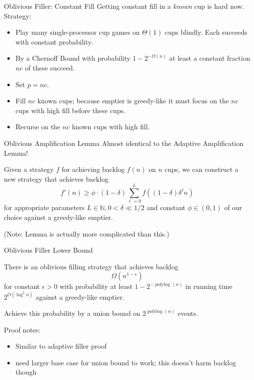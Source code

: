 \documentclass[xcolor=x11names, svgnames, rgb]{beamer}
\newcommand{\polylog}{\operatorname{polylog}}
\begin{document}
\begin{frame}[t]{Oblivious Filler: Constant Fill}
  Getting constant fill in a \emph{known} cup is hard now. Strategy:
  \begin{itemize}
    \item Play many single-processor cup games on $\Theta(1)$ cups
      blindly. Each succeeds with constant probability.
    \item By a Chernoff Bound with probability $1-2^{-\Omega(n)}$ at least a constant fraction $nc$ of these succeed.
    \item Set $p=nc$.
    \item Fill $nc$ known cups; because emptier is greedy-like it must focus on the $nc$ cups with high fill before these cups.
    \item Recurse on the $nc$ known cups with high fill.
  \end{itemize}
\end{frame}

\begin{frame}[t]{Oblivious Amplification Lemma}
Almost identical to the Adaptive Amplification Lemma!
  \begin{lemma}
    Given a strategy $f$ for achieving backlog $f(n)$ on $n$ cups, we can construct a new strategy that achieves backlog 
    $$f'(n) \ge \phi \cdot (1-\delta)\sum_{\ell=0}^L f((1-\delta)\delta^\ell n)$$
    for appropriate parameters $L\in\mathbb{N}, 0<\delta\ll 1/2$ and constant $\phi \in (0,1)$ of our choice against a greedy-like emptier.
  \end{lemma}

  (Note: Lemma is actually more complicated than this.)
\end{frame}

\begin{frame}[t]{Oblivious Filler Lower Bound }
  \begin{theorem}
    There is an oblivious filling strategy that achieves backlog
    $$\Omega(n^{1-\epsilon})$$ for constant $\epsilon > 0$ with probability at
    least $1-2^{-\polylog(n)}$ in running time $2^{O(\log^2 n)}$ against a greedy-like emptier.
  \end{theorem}

  Achieve this probability by a union bound on $2^{\polylog(n)}$ events.

  \vspace{0.5cm}
  Proof notes: 
  \begin{itemize}
    \item Similar to adaptive filler proof
    \item need larger base case for union bound to work; this doesn't harm backlog though
  \end{itemize}
\end{frame}
\end{document}
